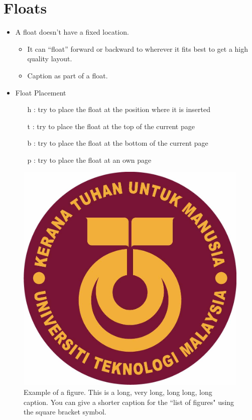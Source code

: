 \documentclass{utmthesis}
\begin{document}
\section{Floats}
\begin{itemize}
\item A float doesn't have a fixed location. 
\begin{itemize}
\item It can ``float'' forward or backward to wherever it fits best to
get a high quality layout. 
\item Caption as part of a float.
\end{itemize}
\item Float Placement
\begin{itemize}
\item [h]: try to place the float at the
position where it is inserted 
\item [t]: try to place the float at the top
of the current page
\item [b]: try to place the float at the
bottom of the current page
\item [p]: try to place the float at an own
page 
\end{itemize}
\end{itemize}

\begin{figure}[!ht]
	\centering
	\includegraphics[width=0.5\linewidth]{./figs/utm02}
	\caption{Example of a figure. This is a long, very long, long long, long caption.  You can give a shorter caption for the ``list of figures" using the square bracket symbol.}
\end{figure}
\end{document}
